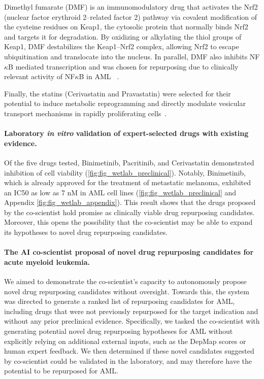 Dimethyl fumarate (DMF) is an immunomodulatory drug that activates the Nrf2 (nuclear factor erythroid 2–related factor 2) pathway via covalent modification of the cysteine residues on Keap1, the cytosolic protein that normally binds Nrf2 and targets it for degradation. By oxidizing or alkylating the thiol groups of Keap1, DMF destabilizes the Keap1–Nrf2 complex, allowing Nrf2 to escape ubiquitination and translocate into the nucleus. In parallel, DMF also inhibits NF$\kappa$B mediated transcription and was chosen for repurposing due to clinically relevant activity of NF$\kappa$B in AML ~\citep{bosman2016constitutive,hou2023phf6}. 

Finally, the statins (Cerivastatin and Pravastatin) were selected for their potential to induce metabolic reprogramming and directly modulate vesicular transport mechanisms in rapidly proliferating cells~\citep{banker2004cholesterol}.

\paragraph{Laboratory \textit{in vitro} validation of expert-selected drugs with existing evidence.}
Of the five drugs tested, Binimetinib, Pacritinib, and Cerivastatin demonstrated inhibition of cell viability (\cref{fig:fig_wetlab_preclinical}). Notably, Binimetinib, which is already approved for the treatment of metastatic melanoma, exhibited an IC50 as low as 7 nM in AML cell lines (\cref{fig:fig_wetlab_preclinical} and Appendix \cref{fig:fig_wetlab_appendix}). This result shows that the drugs proposed by the co-scientist hold promise as clinically viable drug repurposing candidates. Moreover, this opens the possibility that the co-scientist may be able to expand its hypotheses to novel drug repurposing candidates.

\paragraph{The AI co-scientist proposal of novel drug repurposing candidates for acute myeloid leukemia.}
\label{sec:result_drug_novel}
We aimed to demonstrate the co-scientist's capacity to autonomously propose novel drug repurposing candidates without oversight. Towards this, the system was directed to generate a ranked list of repurposing candidates for AML, including drugs that were not previously repurposed for the target indication and without any prior preclinical evidence. Specifically, we tasked the co-scientist with generating potential novel drug repurposing hypotheses for AML without explicitly relying on additional external inputs, such as the DepMap scores or human expert feedback. We then determined if these novel candidates suggested by co-scientist could be validated in the laboratory, and may therefore have the potential to be repurposed for AML. 


